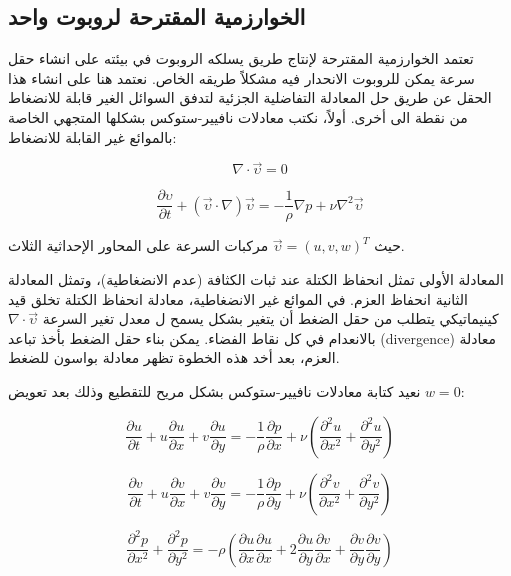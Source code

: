 \subsection{الخوارزمية المقترحة لروبوت واحد}

تعتمد الخوارزمية المقترحة لإنتاج طريق يسلكه الروبوت في بيئته على انشاء حقل سرعة يمكن للروبوت الانحدار فيه مشكلاً طريقه الخاص. نعتمد هنا على انشاء هذا الحقل عن طريق حل المعادلة التفاضلية الجزئية لتدفق السوائل الغير قابلة للانضغاط من نقطة الى أخرى.
أولاً، نكتب معادلات نافيير-ستوكس بشكلها المتجهي الخاصة بالموائع غير القابلة للانضغاط:




\begin{equation}
 \nabla \cdot \vec{\upsilon} = 0  
\end{equation}

\begin{equation}
 \frac{\partial \upsilon }{\partial t} +  \left(\vec{\upsilon }\cdot\nabla\right)\vec{\upsilon } = -\frac{1}{\rho}\nabla p+\nu\nabla^2\vec{\upsilon } 
\end{equation}

حيث $\vec{\upsilon } = (u,v,w)^T$ مركبات السرعة على المحاور الإحداثية الثلاث.

المعادلة الأولى تمثل انحفاظ الكتلة عند ثبات الكثافة (عدم الانضغاطية)، وتمثل المعادلة الثانية انحفاظ العزم. في الموائع غير الانضغاطية، معادلة انحفاظ الكتلة تخلق قيد كينيماتيكي يتطلب من حقل الضغط أن يتغير بشكل يسمح ل معدل تغير السرعة $\nabla \cdot \vec{\upsilon}$ بالانعدام في كل نقاط الفضاء. يمكن بناء حقل الضغط بأخذ تباعد (divergence) معادلة العزم، بعد أخد هذه الخطوة تظهر معادلة بواسون للضغط.


نعيد كتابة معادلات نافيير-ستوكس بشكل مريح للتقطيع وذلك بعد تعويض $ w=0 $:

\begin{equation}\label{eq:11:3}
\frac{\partial u}{\partial t}+u\frac{\partial u}{\partial x}+v\frac{\partial u}{\partial y}=-\frac{1}{\rho}\frac{\partial p}{\partial x}+\nu\left(\frac{\partial^2u}{\partial x^2}+\frac{\partial^2u}{\partial y^2}\right)
\end{equation}

\begin{equation}\label{eq:11:4}
\frac{\partial v}{\partial t}+u\frac{\partial v}{\partial x}+v\frac{\partial v}{\partial y}=-\frac{1}{\rho}\frac{\partial p}{\partial y}+\nu\left(\frac{\partial^2v}{\partial x^2}+\frac{\partial^2v}{\partial y^2}\right)
\end{equation}

\begin{equation}\label{eq:11:5}
\frac{\partial^2p}{\partial x^2}+\frac{\partial^2p}{\partial y^2}=-\rho\left(\frac{\partial u}{\partial x}\frac{\partial u}{\partial x}+2\frac{\partial u}{\partial y}\frac{\partial v}{\partial x}+\frac{\partial v}{\partial y}\frac{\partial v}{\partial y}\right)
\end{equation}


